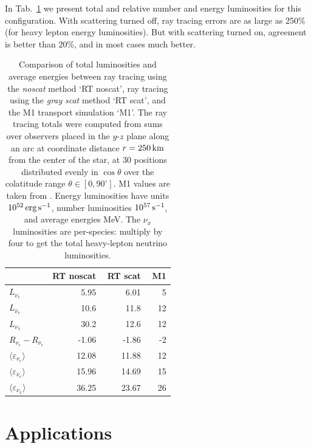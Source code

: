 \documentclass[aps,floatfix,prd,superscriptaddress,twocolumn]{revtex4-1}
\newcommand{\todo}[1]{\marginpar{\tiny{\textcolor{red}{#1}}}}
\renewcommand\todo[1]{} %
\begin{document}
In Tab.~\ref{tab:nsns_rt_vs_m1} we present total and relative number and
energy luminosities for this configuration.
With scattering turned off, ray tracing errors are as large as 250\%
(for heavy lepton energy luminosities).
But with scattering turned on, agreement is better than 20\%, and
in most cases much better.
\todo{get accurage M1 numbers from Francois}

\begin{table}%
  \caption{
    Comparison of total luminosities and average energies between
    ray tracing using the \emph{noscat} method `RT noscat',
    ray tracing using the \emph{gray} \emph{scat} method `RT scat',
    and the M1 transport simulation `M1'.
    The ray tracing totals were computed from sums over
    observers placed in the $y$-$z$ plane along an arc at coordinate distance
    $r=250\,{\rm km}$ from the center of the star, at 30 positions
    distributed evenly in $\cos\theta$ over the colatitude range
    $\theta\in[0,90^{\circ}]$.
    M1 values are taken from \cite[Figs. 7, 9, 10]{fouc2016-m1_evolve_n}.
    Energy luminosities have units $10^{52}\,{\rm erg}\,{\rm s}^{-1}$,
    number luminosities $10^{57}\,{\rm s}^{-1}$, and
    average energies MeV.
    The $\nu_x$ luminosities are per-species:
    multiply by four to get the total heavy-lepton neutrino luminosities.
  }
  \label{tab:nsns_rt_vs_m1}
  \begin{tabularx}{\columnwidth}{X r r r}
    & {\bf RT noscat} & \,\,{\bf RT scat} & \,\,{\bf M1} \\
    \hline
    $L_{\nu_e}$                                 & 5.95 & 6.01 & 5 \\
    $L_{\bar{\nu}_e}$                           & 10.6 & 11.8 & 12 \\
    $L_{\nu_x}$                                 & 30.2 & 12.6 & 12 \\
    $R_{\nu_e}-R_{\bar{\nu}_e}$                 & -1.06 & -1.86 & -2 \\
    $\langle \varepsilon_{\nu_e} \rangle$       & 12.08 & 11.88 & 12 \\
    $\langle \varepsilon_{\bar{\nu}_e} \rangle$ & 15.96 & 14.69 & 15 \\
    $\langle \varepsilon_{\nu_x} \rangle$       & 36.25 & 23.67 & 26 \\
    \hline
  \end{tabularx}
\end{table}

\section{Applications}
\label{sec:applications}
\end{document}
